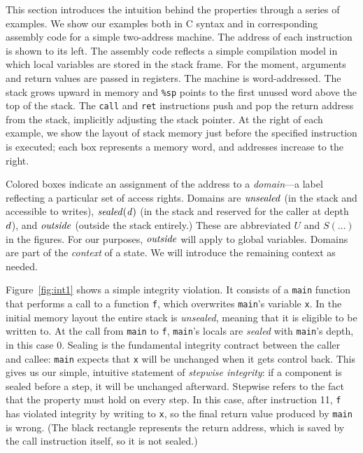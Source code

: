 \documentclass[acmsmall,review,anonymous]{acmart}\settopmatter{printfolios=true,printccs=false,printacmref=false}
\begin{document}
This section introduces the intuition behind the properties through a series
of examples. We show our examples both in C syntax and in corresponding assembly code for a
simple two-address machine. The address of each instruction is shown to its left.
The assembly code reflects a simple compilation model in which
local variables are stored in the stack frame.
For the moment, arguments and return values are passed in registers.
The machine is word-addressed. The stack grows upward in
memory and {\tt \%sp} points to the first unused word above the top of the stack.
The {\tt call} and {\tt ret} instructions push and pop the return address from the stack,
implicitly adjusting the stack pointer.
At the right of each example, we show the layout of stack memory just before
the specified instruction is executed; each box represents a memory word, and
addresses increase to the right.

Colored boxes indicate an assignment of the address to a
{\em domain}---a label reflecting a particular set of access rights. Domains
are \(\mathit{unsealed}\) (in the stack and accessible to writes), \(\mathit{sealed(d)}\)
(in the stack and reserved for the caller at depth \(d\)), and \(\mathit{outside}\)
(outside the stack entirely.) These are abbreviated \(U\) and \(S(\dots)\) in the
figures. For our purposes, \(\mathit{outside}\) will apply to global
variables. Domains are part of the {\em context} of a state.
We will introduce the remaining context as needed.

Figure~\ref{fig:int1} shows a simple integrity violation. It consists of a {\tt main}
function that performs a call to a function {\tt f}, which overwrites {\tt main}'s
variable {\tt x}. In the initial memory layout the entire stack is {\em unsealed},
meaning that it is eligible to be written to. At the call from {\tt main} to
{\tt f}, {\tt main}'s locals are {\em sealed} with {\tt main}'s depth,
in this case 0. Sealing is the fundamental integrity contract between the caller and callee:
{\tt main} expects that {\tt x} will be unchanged when it gets control back.
This gives us our simple, intuitive statement of {\em stepwise integrity}:
if a component is sealed before a step, it will be unchanged afterward. Stepwise
refers to the fact that the property must hold on every step. %
In this case, after instruction 11, {\tt f} has violated integrity by writing to {\tt x},
so the final return value produced by {\tt main} is wrong.
%
(The black rectangle represents the return address, which is saved by the call
instruction itself, so it is not sealed.)
\end{document}
